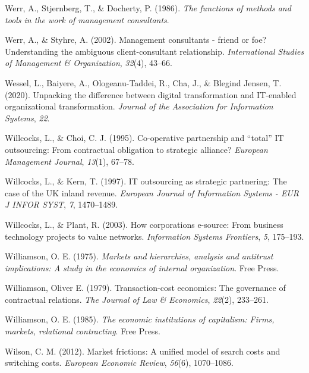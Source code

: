 \documentclass[
  man,floatsintext]{apa6}
\newlength{\cslhangindent}
\newenvironment{CSLReferences}[2] %
 {\begin{list}{}{%
  \setlength{\itemindent}{0pt}
  \setlength{\leftmargin}{0pt}
  \setlength{\parsep}{0pt}
  \ifodd #1
   \setlength{\leftmargin}{\cslhangindent}
   \setlength{\itemindent}{-1\cslhangindent}
  \fi
  \setlength{\itemsep}{#2\baselineskip}}}
 {\end{list}}
\begin{document}
\begin{CSLReferences}{1}{0}
Werr, A., Stjernberg, T., \& Docherty, P. (1986). \emph{The functions of methods and tools in the work of management consultants}.

Werr, A., \& Styhre, A. (2002). Management consultants - friend or foe? Understanding the ambiguous client-consultant relationship. \emph{International Studies of Management \& Organization}, \emph{32}(4), 43--66.

Wessel, L., Baiyere, A., Ologeanu-Taddei, R., Cha, J., \& Blegind Jensen, T. (2020). Unpacking the difference between digital transformation and IT-enabled organizational transformation. \emph{Journal of the Association for Information Systems}, \emph{22}.

Willcocks, L., \& Choi, C. J. (1995). Co-operative partnership and {``total''} IT outsourcing: From contractual obligation to strategic alliance? \emph{European Management Journal}, \emph{13}(1), 67--78.

Willcocks, L., \& Kern, T. (1997). IT outsourcing as strategic partnering: The case of the UK inland revenue. \emph{European Journal of Information Systems - EUR J INFOR SYST}, \emph{7}, 1470--1489.

Willcocks, L., \& Plant, R. (2003). How corporations e-source: From business technology projects to value networks. \emph{Information Systems Frontiers}, \emph{5}, 175--193.

Williamson, O. E. (1975). \emph{Markets and hierarchies, analysis and antitrust implications: A study in the economics of internal organization}. Free Press.

Williamson, Oliver E. (1979). Transaction-cost economics: The governance of contractual relations. \emph{The Journal of Law \& Economics}, \emph{22}(2), 233--261.

Williamson, O. E. (1985). \emph{The economic institutions of capitalism: Firms, markets, relational contracting}. Free Press.

Wilson, C. M. (2012). Market frictions: A unified model of search costs and switching costs. \emph{European Economic Review}, \emph{56}(6), 1070--1086.


\end{CSLReferences}
\end{document}
